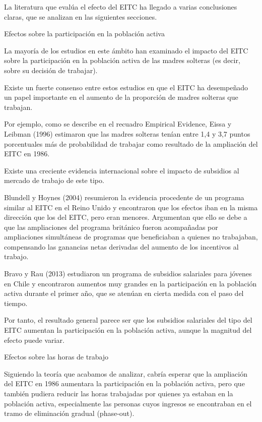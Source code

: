 \documentclass[10pt,a4paper]{article}
\begin{document}
La literatura que evalúa el efecto del EITC ha llegado a varias conclusiones claras, que se analizan en las siguientes secciones.

Efectos sobre la participación en la población activa

La mayoría de los estudios en este ámbito han examinado el impacto del EITC sobre la participación en la población activa de las madres solteras (es decir, sobre su decisión de trabajar).

Existe un fuerte consenso entre estos estudios en que el EITC ha desempeñado un papel importante en el aumento de la proporción de madres solteras que trabajan.

Por ejemplo, como se describe en el recuadro Empirical Evidence, Eissa y Leibman (1996) estimaron que las madres solteras tenían entre 1,4 y 3,7 puntos porcentuales más de probabilidad de trabajar como resultado de la ampliación del EITC en 1986.

Existe una creciente evidencia internacional sobre el impacto de subsidios al mercado de trabajo de este tipo.

Blundell y Hoynes (2004) resumieron la evidencia procedente de un programa similar al EITC en el Reino Unido y encontraron que los efectos iban en la misma dirección que los del EITC, pero eran menores. Argumentan que ello se debe a que las ampliaciones del programa británico fueron acompañadas por ampliaciones simultáneas de programas que beneficiaban a quienes no trabajaban, compensando las ganancias netas derivadas del aumento de los incentivos al trabajo.

Bravo y Rau (2013) estudiaron un programa de subsidios salariales para jóvenes en Chile y encontraron aumentos muy grandes en la participación en la población activa durante el primer año, que se atenúan en cierta medida con el paso del tiempo.

Por tanto, el resultado general parece ser que los subsidios salariales del tipo del EITC aumentan la participación en la población activa, aunque la magnitud del efecto puede variar.

Efectos sobre las horas de trabajo

Siguiendo la teoría que acabamos de analizar, cabría esperar que la ampliación del EITC en 1986 aumentara la participación en la población activa, pero que también pudiera reducir las horas trabajadas por quienes ya estaban en la población activa, especialmente las personas cuyos ingresos se encontraban en el tramo de eliminación gradual (phase-out).
\end{document}
